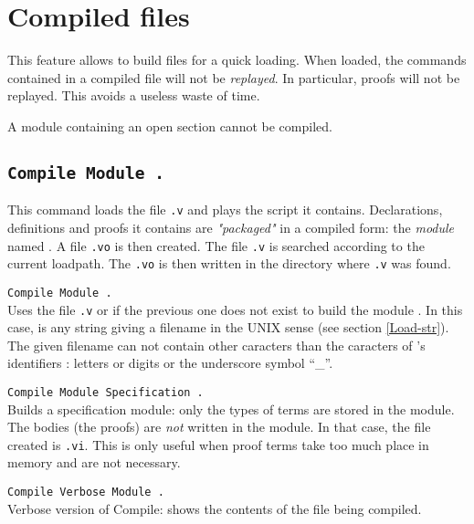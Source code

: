 \begin{ErrMsgs}
\item {}
\end{ErrMsgs}

\section{Compiled files}\label{compiled}

This feature allows to build files for a quick loading. When loaded,
the commands contained in a compiled file will not be {\em replayed}.
In particular, proofs will not be replayed. This avoids a useless
waste of time.

\Rem A module containing an open section cannot be compiled. 

\subsection{\tt Compile Module {\ident}.}
This command loads the file
{\ident}{\tt .v} and plays the script it contains. Declarations,
definitions and proofs it contains are {\em "packaged"} in a compiled
form: the {\em module} named {\ident}.
A file {\ident}{\tt .vo} is then created.
The file {\ident}{\tt .v} is searched according to the
current loadpath.
The {\ident}{\tt .vo} is then written in the directory where
{\ident}{\tt .v} was found.

\begin{Variants}
\item \texttt{Compile Module {\ident} {\str}.}\\ 
  Uses the file {\str}{\tt .v} or {\str} if the previous one does not
  exist to build the module {\ident}. In this case, {\str} is any
  string giving a filename in the UNIX sense (see section
  \ref{Load-str}). 
  \Warning The given filename can not contain other caracters than
  the caracters of \Coq's identifiers : letters or digits or the
  underscore symbol ``\_''.

\item \texttt{Compile Module Specification {\ident}.}\\
  Builds a specification module: only the types of terms are stored
  in the module. The bodies (the proofs) are {\em not} written
  in the module. In that case, the file created is {\ident}{\tt .vi}.
  This is only useful when proof terms take too much place in memory
  and are not necessary.
  
\item \texttt{Compile Verbose Module {\ident}.}\\ 
  Verbose version of Compile: shows the contents of the file being
  compiled.
\end{Variants}

